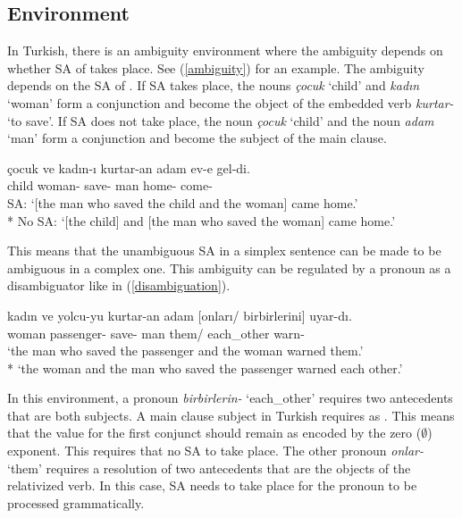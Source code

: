 \subsection{Environment}

In Turkish, there is an ambiguity environment where the ambiguity depends on whether SA of {\Case} takes place. See (\ref{ambiguity}) for an example. The ambiguity depends on the SA of {\Acc}. If SA takes place, the nouns \textit{çocuk} `child' and \textit{kadın} `woman' form a conjunction and become the object of the embedded verb \textit{kurtar-} `to save'. If SA does not take place, the noun \textit{çocuk} `child' and the noun \textit{adam} `man' form a conjunction and become the subject of the main clause.

\begin{exe}
    \ex \label{ambiguity} 
    \gll çocuk ve kadın-ı kurtar-an adam ev-e gel-di. \\ 
    child {\And} woman-{\Acc} save-{\Fp} man home-{\Dat} come-{\Pst} \\
    \glt SA: `[the man who saved the child and the woman] came home.'\\*
    No SA: `[the child] and [the man who saved the woman] came home.'
\end{exe}

This means that the unambiguous {\Case} SA in a simplex sentence can be made to be ambiguous in a complex one. This ambiguity can be regulated by a pronoun as a disambiguator like in (\ref{disambiguation}).

\begin{exe}
\ex \label{disambiguation}
\gll kadın ve yolcu-yu kurtar-an adam {[onları/ birbirlerini]} uyar-dı. \\ 
woman {\And} passenger-{\Acc} save-{\Fp} man {them/ each\_other} warn-{\Pst} \\
\glt `the man who saved the passenger and the woman warned them.' \\*
`the woman and the man who saved the passenger warned each other.'
\end{exe}

In this environment, a pronoun \textit{birbirlerin-{\Case}} `each\_other' requires two antecedents that are both subjects. A main clause subject in Turkish requires {\Nom} as {\Case}. This means that the {\Case} value for the first conjunct should remain {\Nom} as encoded by the zero ($\emptyset$) exponent. This requires that no SA to take place. The other pronoun \textit{onlar-{\Case}} `them' requires a resolution of two antecedents that are the objects of the relativized verb. In this case, SA needs to take place for the pronoun to be processed grammatically. 


